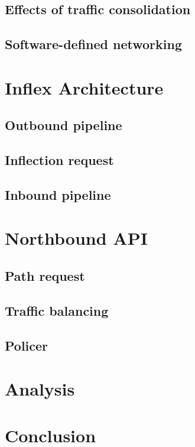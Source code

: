 \subsection{Effects of traffic consolidation}
\subsection{Software-defined networking}

\section{Inflex Architecture}

\subsection{Outbound pipeline}
\subsection{Inflection request}
\subsection{Inbound pipeline}

\section{Northbound API}
\subsection{Path request}
\subsection{Traffic balancing}
\subsection{Policer}

\section{Analysis}

\section{Conclusion}
